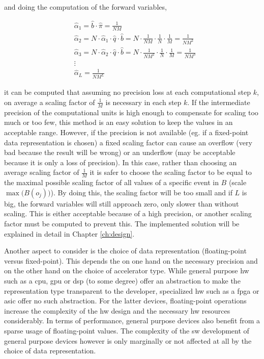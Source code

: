 \documentclass[mscthesis]{usiinfthesis}
\begin{document}
and doing the computation of the forward variables,

\begin{equation}\begin{split}
    \label{eq:scaling_estimation}
    &\hat{\alpha}_1 = \hat{b} \cdot \hat{\pi} = \frac{1}{NM} \\
    &\hat{\alpha}_2 = N \cdot \hat{\alpha}_1 \cdot \hat{q} \cdot \hat{b} =
        N \cdot \frac{1}{NM} \cdot \frac{1}{N} \cdot \frac{1}{M} =
        \frac{1}{NM^2} \\
    &\hat{\alpha}_3 = N \cdot \hat{\alpha}_2 \cdot \hat{q} \cdot \hat{b} =
        N \cdot \frac{1}{NM^2} \cdot \frac{1}{N} \cdot \frac{1}{M} =
        \frac{1}{NM^3} \\
    &\vdots\\
    & \hat{\alpha}_L = \frac{1}{NM^L}
\end{split}\end{equation}

it can be computed that assuming no precision loss at each computational step
$k$, on average a scaling factor of $\frac{1}{M}$ is necessary in each step
$k$. If the intermediate precision of the computational units is high enough to
compensate for scaling too much or too few, this method is an easy solution to
keep the values in an acceptable range. However, if the precision is not
available (eg. if a fixed-point data representation is chosen) a fixed scaling
factor can cause an overflow (very bad because the result will be wrong) or an
underflow (may be acceptable because it is only a loss of precision). In this
case, rather than choosing an average scaling factor of $\frac{1}{M}$ it is
safer to choose the scaling factor to be equal to the maximal possible scaling
factor of all values of a specific event in $B$ (scale $\max\big(B(o_j)\big)$).
By doing this, the scaling factor will be too small and if $L$ is big, the
forward variables will still approach zero, only slower than without scaling.
This is either acceptable because of a high precision, or another scaling
factor must be computed to prevent this. The implemented solution will be
explained in detail in Chapter \ref{ch:design}.

Another aspect to consider is the choice of data representation (floating-point
versus fixed-point). This depends the on one hand on the necessary precision
and on the other hand on the choice of accelerator type. While general purpose
\gls{hw} such as a \gls{cpu}, \gls{gpu} or \gls{dsp} (to some degree) offer an
abstraction to make the representation type transparent to the developer,
specialized \gls{hw} such as a \gls{fpga} or \gls{asic} offer no such
abstraction. For the latter devices, floating-point operations increase the
complexity of the \gls{hw} design and the necessary \gls{hw} resources
considerably. In terms of performance, general purpose devices also benefit
from a sparse usage of floating-point values. The complexity of the \gls{sw}
development of general purpose devices however is only marginally or not
affected at all by the choice of data representation.
\end{document}
